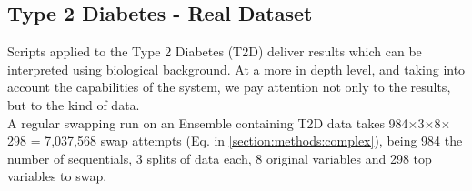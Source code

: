 \subsection{Type 2 Diabetes - Real Dataset}
Scripts applied to the Type 2 Diabetes (T2D) deliver results which can be interpreted using biological background. At a more in depth level, and taking into account the capabilities of the system, we pay attention not only to the results, but to the kind of data.
\\

A regular swapping run on an Ensemble containing T2D data takes 984$\times$3$\times$8$\times$298 = 7,037,568 swap attempts (Eq. in \ref{section:methods:complex}), being 984 the number of sequentials, 3 splits of data each, 8 original variables and 298 top variables to swap.
\\
